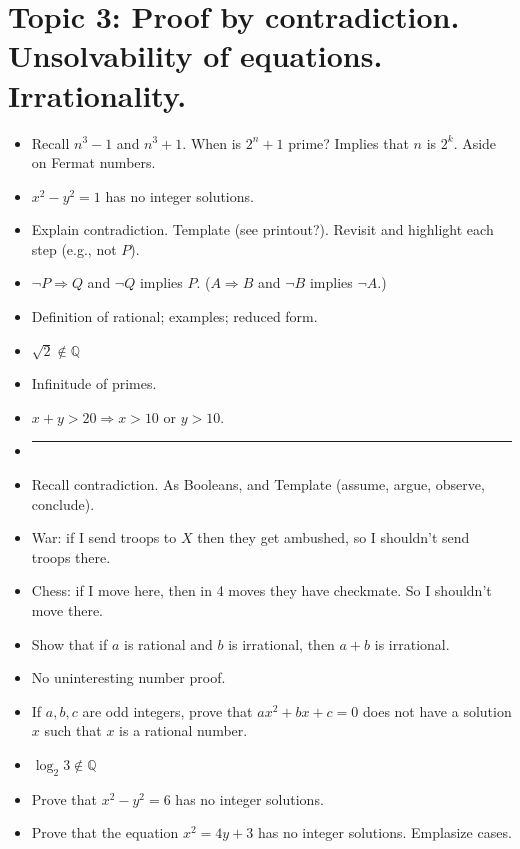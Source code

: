 \documentclass[12pt]{article}
\newcommand{\Q}{{\mathbb Q}}
\begin{document}
\newpage
\section[3 (\csname dateWeek3\endcsname): Proof by contradiction. Unsolvability. Irrationality.]{Topic  3: Proof by contradiction. Unsolvability of equations. Irrationality.}




\begin{itemize}
\item Recall $n^3 - 1$ and $n^3 + 1$. When is $2^n + 1$ prime? Implies that $n$ is $2^k$. Aside on Fermat numbers.  
\item $x^2 - y^2 = 1$ has no integer solutions.
\item Explain contradiction. Template (see printout?). Revisit and highlight each step (e.g., not $P$). 
\item $\neg P \Rightarrow Q$ and $\neg Q$ implies $P$. ($A \Rightarrow B$ and $\neg B$ implies $\neg A$.)
\item Definition of rational; examples; reduced form.
\item $\sqrt{2} \not \in \Q$
\item Infinitude of primes.
\item $x + y > 20 \Rightarrow x > 10$ or $y > 10$.
\item []       \vspace{0.1cm}\hrule\vspace{-0.4cm}
\item Recall contradiction. As Booleans, and Template (assume, argue, observe, conclude).
\item War: if I send troops to $X$ then they get ambushed, so I shouldn't send troops there.
\item Chess: if I move here, then in 4 moves they have checkmate. So I shouldn't move there.
\item Show that if $a$ is rational and $b$ is irrational, then $a + b$ is irrational.
\item No uninteresting number proof.
\item If $a, b, c$ are odd integers, prove that $ax^2 + bx + c = 0$ does not have a solution $x$ such that $x$ is a rational number.  
\item $\log_2{3} \not \in \Q$
\item Prove that $x^2 - y^2 = 6$ has no integer solutions.

\item \textsf{}Prove that the equation $x^2 = 4y + 3$ has no integer solutions. Emplasize cases.


\end{itemize}
\end{document}

